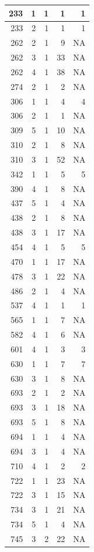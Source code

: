 \documentclass[11pt,]{book}
\begin{document}
\begin{table}
\begin{tabular}[t]{r|r|r|r|r}
\hline
233 & 1 & 1 & 1 & 1\\
\hline
233 & 2 & 1 & 1 & 1\\
\hline
262 & 2 & 1 & 9 & NA\\
\hline
262 & 3 & 1 & 33 & NA\\
\hline
262 & 4 & 1 & 38 & NA\\
\hline
274 & 2 & 1 & 2 & NA\\
\hline
306 & 1 & 1 & 4 & 4\\
\hline
306 & 2 & 1 & 1 & NA\\
\hline
309 & 5 & 1 & 10 & NA\\
\hline
310 & 2 & 1 & 8 & NA\\
\hline
310 & 3 & 1 & 52 & NA\\
\hline
342 & 1 & 1 & 5 & 5\\
\hline
390 & 4 & 1 & 8 & NA\\
\hline
437 & 5 & 1 & 4 & NA\\
\hline
438 & 2 & 1 & 8 & NA\\
\hline
438 & 3 & 1 & 17 & NA\\
\hline
454 & 4 & 1 & 5 & 5\\
\hline
470 & 1 & 1 & 17 & NA\\
\hline
478 & 3 & 1 & 22 & NA\\
\hline
486 & 2 & 1 & 4 & NA\\
\hline
537 & 4 & 1 & 1 & 1\\
\hline
565 & 1 & 1 & 7 & NA\\
\hline
582 & 4 & 1 & 6 & NA\\
\hline
601 & 4 & 1 & 3 & 3\\
\hline
630 & 1 & 1 & 7 & 7\\
\hline
630 & 3 & 1 & 8 & NA\\
\hline
693 & 2 & 1 & 2 & NA\\
\hline
693 & 3 & 1 & 18 & NA\\
\hline
693 & 5 & 1 & 8 & NA\\
\hline
694 & 1 & 1 & 4 & NA\\
\hline
694 & 3 & 1 & 4 & NA\\
\hline
710 & 4 & 1 & 2 & 2\\
\hline
722 & 1 & 1 & 23 & NA\\
\hline
722 & 3 & 1 & 15 & NA\\
\hline
734 & 3 & 1 & 21 & NA\\
\hline
734 & 5 & 1 & 4 & NA\\
\hline
745 & 3 & 2 & 22 & NA\\
\hline

\end{tabular}
\end{table}
\end{document}
